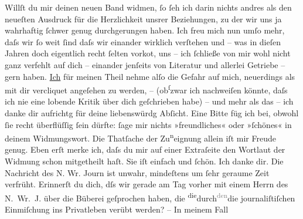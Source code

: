 \begin{ledgroupsized}[t]{13cm}
               Willſt du mir deinen neuen Band
               widmen, ſo ſeh ich darin nichts andres als den neueſten Ausdruck für die Herzlichkeit
               unsrer Beziehungen, zu der wir uns ja wahrhaftig ſchwer genug durchgerungen haben.
               Ich freu mich nun umſo mehr, daſs wir ſo weit ſind daſs wir einander wirklich
               verſtehen und – was in dieſen Jahren {\pb}doch eigentlich recht
               ſelten vorko{\geminationm}t, uns – ich ſchließe von mir wohl nicht
               ganz verfehlt auf dich – einander jenſeits von Literatur und allerlei Getriebe – gern
               haben. \uline{Ich} für meinen Theil nehme alſo die Gefahr auf
               mich, neuerdings als mit dir vercliquet angeſehen zu werden, \introOben{}–\introOben{} (ob\substVorne{}\textsuperscript{ſ}\substDazwischen{}z\substHinten{}war ich nachweiſen könnte, daſs ich nie eine lobende Kritik über dich
               geſchrieben habe) – und {\pb}mehr als das – ich danke dir aufrichtg für deine liebenswürdg Abſicht. Eine Bitte
               füg ich bei, obwohl ſie recht überflüſſig ſein dürfte: ſage mir nichts »freundliches«
               oder »ſchönes« in deinem Widmungswort. Die Thatſache der Zu\substVorne{}\textsuperscript{n}\substDazwischen{}ei\substHinten{}gnung allein iſt mir Freude genug.\pend
           \pstart
           Eben erſt merke ich, daſs du mir auf einer Extraſeite den Wortlaut der Widmung schon
               mitgetheilt haſt. Sie iſt einfach und ſchön. Ich danke dir.\pend
           \pstart
           {\pb}Die Nachricht des N. Wr. Journ ist unwahr, mindeſtens um ſehr geraume
               Zeit verfrüht. Erinnerſt du dich, dſs wir gerade am Tag vorher mit einem Herrn des N. Wr. J. über die Büberei geſprochen haben, die \substVorne{}\textsuperscript{die}\substDazwischen{}durch\substHinten{}{ }\substVorne{}\textsuperscript{\textcolor{gray}{den}}\substDazwischen{}die\substHinten{} journaliſtiſchen Einmiſchung ins Privatleben verübt werden? – In meinem Fall

\end{ledgroupsized}
